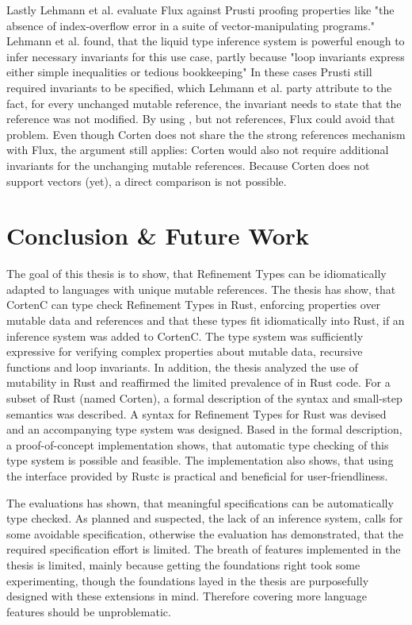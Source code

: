 \documentclass[twoside, english]{sdqthesis}
\theoremstyle{definition}
\begin{document}
Lastly Lehmann et al. evaluate Flux against Prusti proofing properties like "the absence of index-overflow error in a suite of vector-manipulating programs." \cite[p. 2]{lehmann_flux_2022}
Lehmann et al. found, that the liquid type inference system is powerful enough to infer necessary invariants for this use case, partly because "loop invariants express either simple inequalities or tedious bookkeeping" \cite[p. 21]{lehmann_flux_2022}
In these cases Prusti still required invariants to be specified, which Lehmann et al. party attribute to the fact, for every unchanged mutable reference, the invariant needs to state that the reference was not modified. By using , but not  references, Flux could avoid that problem.
Even though Corten does not share the the strong references mechanism with Flux, the argument still applies: Corten would also not require additional invariants for the unchanging mutable references.
Because Corten does not support vectors (yet), a direct comparison is not possible.



\chapter{Conclusion \& Future Work} \label{ch:conclusion}

The goal of this thesis is to show, that Refinement Types can be idiomatically adapted to languages with unique mutable references. 
The thesis has show, that CortenC can type check Refinement Types in Rust, enforcing properties over mutable data and references and that these types fit idiomatically into Rust, if an inference system was added to CortenC.
The type system was sufficiently expressive for verifying complex properties about mutable data, recursive functions and loop invariants. 
In addition, the thesis analyzed the use of mutability in Rust and reaffirmed the limited prevalence of  in Rust code.
For a subset of Rust (named Corten), a formal description of the syntax and small-step semantics was described.
A syntax for Refinement Types for Rust was devised and an accompanying type system was designed.
Based in the formal description, a proof-of-concept implementation shows, that automatic type checking of this type system is possible and feasible. The implementation also shows, that using the interface provided by Rustc is practical and beneficial for user-friendliness.

The evaluations has shown, that meaningful specifications can be automatically type checked. 
As planned and suspected, the lack of an inference system, calls for some avoidable specification, otherwise the evaluation has demonstrated, that the required specification effort is limited.
The breath of features implemented in the thesis is limited, mainly because getting the foundations right took some experimenting, though the foundations layed in the thesis are purposefully designed with these extensions in mind. Therefore covering more language features should be unproblematic.
\end{document}
